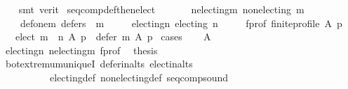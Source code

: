\begin{isabellebody}
\ \ \isamarkupfalse%
\ {\isacharparenleft}{\kern0pt}smt\ {\isacharparenleft}{\kern0pt}verit{\isacharparenright}{\kern0pt}{\isacharparenright}{\kern0pt}%
\endisatagproof
{\isafoldproof}%
%
\isadelimproof
\isanewline
%
\endisadelimproof
\isanewline
{}\isamarkupfalse%
\ seq{\isacharunderscore}{\kern0pt}comp{\isacharunderscore}{\kern0pt}def{\isacharunderscore}{\kern0pt}then{\isacharunderscore}{\kern0pt}elect{\isacharcolon}{\kern0pt}\isanewline
\ \ \isanewline
\ \ \ \ n{\isacharunderscore}{\kern0pt}electing{\isacharunderscore}{\kern0pt}m{\isacharcolon}{\kern0pt}\ {\isachardoublequoteopen}non{\isacharunderscore}{\kern0pt}electing\ m{\isachardoublequoteclose}\ \isanewline
\ \ \ \ def{\isacharunderscore}{\kern0pt}one{\isacharunderscore}{\kern0pt}m{\isacharcolon}{\kern0pt}\ {\isachardoublequoteopen}defers\ {}\ m{\isachardoublequoteclose}\ \isanewline
\ \ \ \ electing{\isacharunderscore}{\kern0pt}n{\isacharcolon}{\kern0pt}\ {\isachardoublequoteopen}electing\ n{\isachardoublequoteclose}\ \isanewline
\ \ \ \ f{\isacharunderscore}{\kern0pt}prof{\isacharcolon}{\kern0pt}\ {\isachardoublequoteopen}finite{\isacharunderscore}{\kern0pt}profile\ A\ p{\isachardoublequoteclose}\isanewline
\ \ \ {\isachardoublequoteopen}elect\ {\isacharparenleft}{\kern0pt}m\ {\isasymtriangleright}\ n{\isacharparenright}{\kern0pt}\ A\ p\ {\isacharequal}{\kern0pt}\ defer\ m\ A\ p{\isachardoublequoteclose}\isanewline
%
\isadelimproof
%
\endisadelimproof
%
\isatagproof
{}\isamarkupfalse%
\ cases\isanewline
\ \ \isamarkupfalse%
\ {\isachardoublequoteopen}A\ {\isacharequal}{\kern0pt}\ {\isacharbraceleft}{\kern0pt}{\isacharbraceright}{\kern0pt}{\isachardoublequoteclose}\isanewline
\ \ \isamarkupfalse%
\ electing{\isacharunderscore}{\kern0pt}n\ n{\isacharunderscore}{\kern0pt}electing{\isacharunderscore}{\kern0pt}m\ f{\isacharunderscore}{\kern0pt}prof\ \isamarkupfalse%
\ {\isacharquery}{\kern0pt}thesis\isanewline
\ \ \ \ \isamarkupfalse%
\ bot{\isachardot}{\kern0pt}extremum{\isacharunderscore}{\kern0pt}uniqueI\ defer{\isacharunderscore}{\kern0pt}in{\isacharunderscore}{\kern0pt}alts\ elect{\isacharunderscore}{\kern0pt}in{\isacharunderscore}{\kern0pt}alts\isanewline
\ \ \ \ \ \ \ \ \ \ electing{\isacharunderscore}{\kern0pt}def\ non{\isacharunderscore}{\kern0pt}electing{\isacharunderscore}{\kern0pt}def\ seq{\isacharunderscore}{\kern0pt}comp{\isacharunderscore}{\kern0pt}sound\isanewline
\ \ \ \ \isamarkupfalse%

\end{isabellebody}
